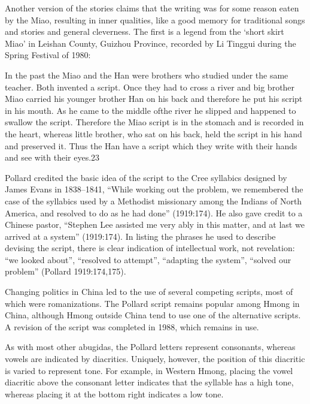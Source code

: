 Another version of the stories claims that the writing was for some reason
eaten by the Miao, resulting in inner qualities, like a good memory for
traditional songs and stories and general cleverness. The first is a legend from
the ‘short skirt Miao’ in Leishan County, Guizhou Province, recorded by Li
Tinggui during the Spring Festival of 1980:

\begin{latexquotation}
In the past the Miao and the Han were brothers who studied under the same
teacher. Both invented a script. Once they had to cross a river and big brother Miao
carried his younger brother Han on his back and therefore he put his script in his
mouth. As he came to the middle ofthe river he slipped and happened to swallow
the script. Therefore the Miao script is in the stomach and is recorded in the heart,
whereas little brother, who sat on his back, held the script in his hand and preserved
it. Thus the Han have a script which they write with their hands and see with their
eyes.23
\end{latexquotation}

Pollard credited the basic idea of the script to the Cree syllabics designed by James Evans in 1838–1841, “While working out the problem, we remembered the case of the syllabics used by a Methodist missionary among the Indians of North America, and resolved to do as he had done” (1919:174). He also gave credit to a Chinese pastor, “Stephen Lee assisted me very ably in this matter, and at last we arrived at a system” (1919:174). In listing the phrases he used to describe devising the script, there is clear indication of intellectual work, not revelation: “we looked about”, “resolved to attempt”, “adapting the system”, “solved our problem” (Pollard 1919:174,175).

Changing politics in China led to the use of several competing scripts, most of which were romanizations. The Pollard script remains popular among Hmong in China, although Hmong outside China tend to use one of the alternative scripts. A revision of the script was completed in 1988, which remains in use.

As with most other abugidas, the Pollard letters represent consonants, whereas vowels are indicated by diacritics. Uniquely, however, the position of this diacritic is varied to represent tone. For example, in Western Hmong, placing the vowel diacritic above the consonant letter indicates that the syllable has a high tone, whereas placing it at the bottom right indicates a low tone.

